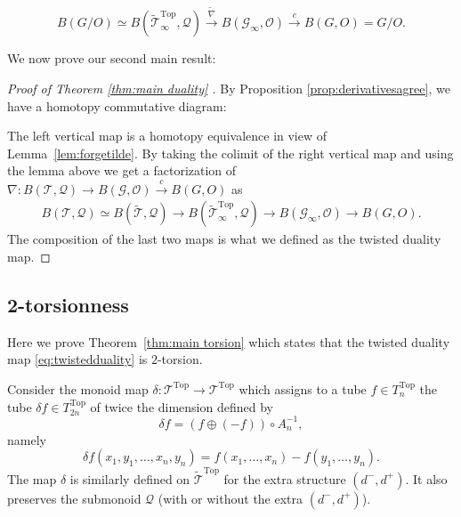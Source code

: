 \documentclass[reqno]{amsart}
\theoremstyle{theorem}
\theoremstyle{remark}
\theoremstyle{definition}
\newcommand{\tnabla}{\widetilde{\nabla}}
\newcommand{\T}{\mathcal{T}}
\newcommand{\TT}{\widetilde{\mathcal{T}}}
\newcommand{\GG}{\mathcal{G}}
\newcommand{\QQ}{\mathcal{Q}}
\newcommand{\OO}{\mathcal{O}}
\newcommand{\TOP}{\mathrm{Top}}
\begin{document}
\begin{equation}\label{eq:twistedduality}
    B(G/O) \simeq B(\TT_\infty^\TOP,\QQ) \xrightarrow{\tnabla} B(\GG_\infty,\OO) \xrightarrow{c} B(G,O)=G/O.
\end{equation}


We now prove our second main result:


\begin{proof}[Proof of Theorem \ref{thm:main duality} ]
  By Proposition \ref{prop:derivativesagree}, we have a homotopy commutative diagram:
  
  \begin{center}
  \end{center}
  The left vertical map is a homotopy equivalence in view of Lemma~\ref{lem:forgetilde}. By taking the colimit of the right vertical map and using the lemma above we get a factorization of $\nabla : B(\T,\QQ) \to B(\GG,\OO) \xrightarrow{c} B(G,O)$ as
  \begin{align*}
    B(\T,\QQ) \simeq B(\TT,\QQ) \to B(\TT_\infty^\TOP,\QQ) \to B(\GG_\infty,\OO) \to B(G,O).
  \end{align*}
  The composition of the last two maps is what we defined as the twisted duality map.
\end{proof}




\subsection{2-torsionness}
Here we prove Theorem~\ref{thm:main torsion} which states that the twisted duality map \eqref{eq:twistedduality} is $2$-torsion.


Consider the monoid map $\delta : \T^\TOP \to \T^\TOP$ which assigns to a tube $f\in T_n^\TOP$ the tube $\delta f \in T_{2n}^\TOP$ of twice the dimension
defined by 
\[\delta f=(f\oplus (-f))\circ A_n^{-1},\] namely
\[\delta f (x_1,y_1,\dots,x_n,y_n)=f(x_1,\dots,x_n)-f(y_1,\dots,y_n).\]
The map $\delta$ is similarly defined on $\TT^\TOP$ for the extra structure $(d^-,d^+)$. It also preserves the submonoid $\QQ$ (with or without the extra $(d^-,d^+)$).
\end{document}
